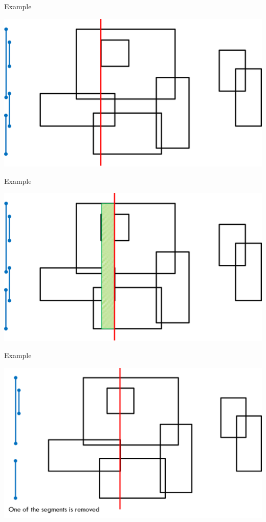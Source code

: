 \documentclass[13pt,onlymath]{beamer}
\begin{document}
\begin{frame}{Example}
\begin{center}
\includegraphics[height=0.6\textheight]{figures/sweep8}
\end{center}
\end{frame}

\begin{frame}{Example}
\begin{center}
\includegraphics[height=0.6\textheight]{figures/sweep9}
\end{center}
\end{frame}

\begin{frame}{Example}
\begin{center}
\includegraphics[height=0.6\textheight]{figures/sweep10}
\end{center}
\end{frame}
\end{document}
